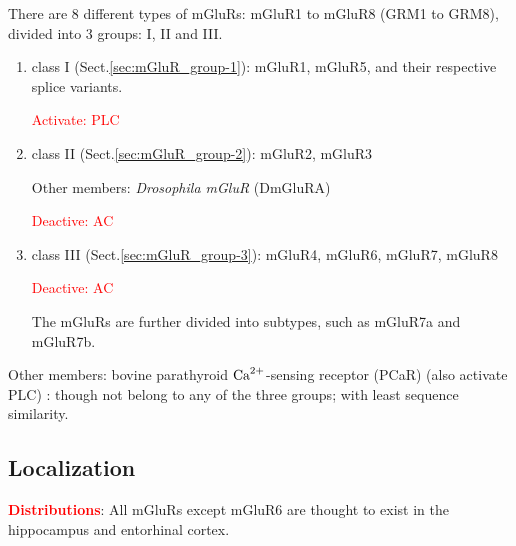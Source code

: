 
There are 8 different types of mGluRs: mGluR1 to mGluR8 (GRM1 to GRM8), divided 
into 3 groups: I, II and III. 
\begin{enumerate}
  \item class I (Sect.\ref{sec:mGluR_group-1}): mGluR1, mGluR5, and their
  respective splice variants.
  
\textcolor{red}{Activate: PLC}
  
  \item class II (Sect.\ref{sec:mGluR_group-2}): mGluR2, mGluR3

Other members: {\it Drosophila mGluR} (DmGluRA)
  
\textcolor{red}{Deactive: AC}
  
  \item class III (Sect.\ref{sec:mGluR_group-3}): mGluR4, mGluR6, mGluR7, mGluR8

\textcolor{red}{Deactive: AC}

The mGluRs are further divided into subtypes, such as mGluR7a and mGluR7b.
\end{enumerate}
Other members: bovine parathyroid ${\text{Ca}^{2+}}$-sensing receptor (PCaR) (also activate
PLC) : though not belong to any of the three groups; with least sequence
similarity.

\subsection{Localization}
\label{sec:mGluR_group-1-distribution}
\label{sec:mGluR_group-2-distribution}
\label{sec:mGluR_group-3-distribution}

\textcolor{red}{\bf Distributions}: All mGluRs except mGluR6 are thought to
exist in the hippocampus and entorhinal cortex.

